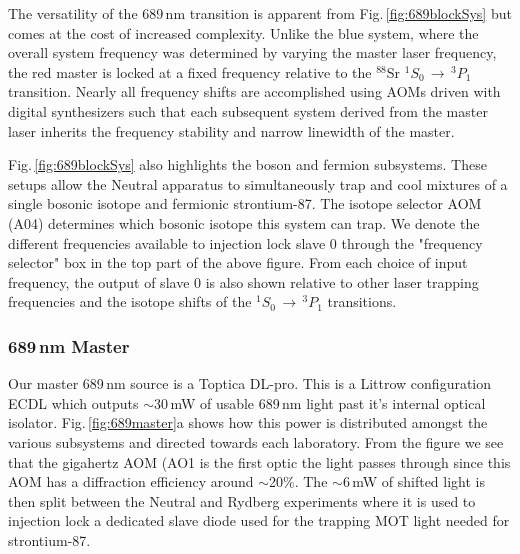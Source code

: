 The versatility of the 689\,nm transition is apparent from Fig.\,\ref{fig:689blockSys} but comes at the cost of increased complexity.
Unlike the blue system, where the overall system frequency was determined by varying the master laser frequency, the red master is locked at a fixed frequency relative to the $^{88}$Sr $^1S_0\,\rightarrow\,^3P_1$ transition.
Nearly all frequency shifts are accomplished using AOMs driven with digital synthesizers such that each subsequent system derived from the master laser inherits the frequency stability and narrow linewidth of the master.

Fig.\,\ref{fig:689blockSys} also highlights the boson and fermion subsystems.
These setups allow the Neutral apparatus to simultaneously trap and cool mixtures of a single bosonic isotope and fermionic strontium-87.
The isotope selector AOM (A04) determines which bosonic isotope this system can trap.
We denote the different frequencies available to injection lock slave 0 through the "frequency selector" box in the top part of the above figure.
From each choice of input frequency, the output of slave 0 is also shown relative to other laser trapping frequencies and the isotope shifts of the $^1S_0\,\rightarrow\,^3P_1$ transitions.




	
\subsubsection{689\,nm Master}
Our master 689\,nm source is a Toptica DL-pro.
This is a Littrow configuration ECDL which outputs $\sim$30\,mW of usable 689\,nm light past it's internal optical isolator.
Fig.\,\ref{fig:689master}a shows how this power is distributed amongst the various subsystems and directed towards each laboratory.
From the figure we see that the gigahertz AOM (AO1  is the first optic the light passes through since this AOM has a diffraction efficiency around $\sim$20\%.
The $\sim$6\,mW of shifted light is then split between the Neutral and Rydberg experiments where it is used to injection lock a dedicated slave diode used for the trapping MOT light needed for strontium-87.

